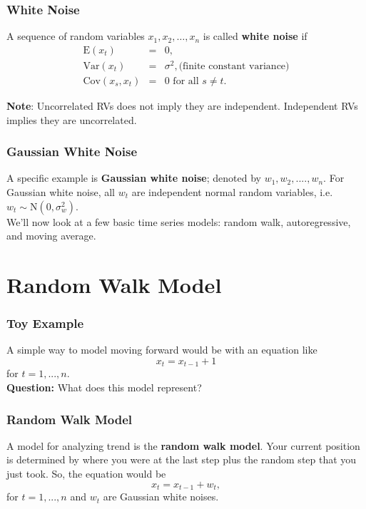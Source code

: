 \documentclass[%
xcolor=pdftex]{beamer}
\begin{document}
\begin{frame}
\frametitle{White Noise}
A sequence of random variables
$x_1,x_2,\ldots,x_n$ is called \textbf{white noise} if
\begin{eqnarray*}
\mbox{E}(x_t)&=&0, \\
\mbox{Var}(x_t)&=&\sigma^2, \text{(finite constant variance)}\\
\mbox{Cov}(x_s,x_t)&=&0 \mbox{ for all } s \ne t.
\end{eqnarray*}

\textbf{Note}: Uncorrelated RVs does not imply they are independent. Independent RVs implies they are uncorrelated.

\end{frame}

\begin{frame}
\frametitle{Gaussian White Noise}

A specific example is \textbf{Gaussian white noise}; denoted by $w_1, w_2,....,w_n$. For Gaussian white noise, all $w_t$ are independent normal random variables, i.e. $w_t \sim \mbox{N}(0, \sigma_w^2)$.\\
\vspace{5mm}
We'll now look at a few basic time series models: random walk, autoregressive, and moving average.

\end{frame}

\section{Random Walk Model}
\frame{\tableofcontents[currentsection]}

\begin{frame}
\frametitle{Toy Example}

A simple way to model moving
forward would be with an equation like
$$
x_t=x_{t-1}+1
$$
for $t=1,...,n$. \\
\vspace{5mm}
\textbf{Question:} What does this model represent?

\end{frame}

\begin{frame}
\frametitle{Random Walk Model}

A model for analyzing trend is the \textbf{random walk model}. Your current position is determined by where you were at the last step plus the random
step that you just took.  So, the equation would be
\begin{equation} \label{eq:walk}
x_t=x_{t-1}+ w_t,
\end{equation}
for $t=1,...,n$ and $w_t$ are Gaussian white noises.

\end{frame}
\end{document}
